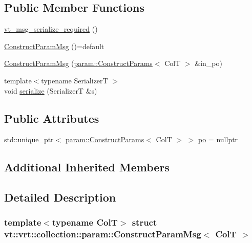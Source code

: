 \subsection*{Public Member Functions}
\begin{DoxyCompactItemize}
\item 
\hyperlink{structvt_1_1vrt_1_1collection_1_1param_1_1_construct_param_msg_a9be1c6d113987cf9f9663ca96714c29f}{vt\+\_\+msg\+\_\+serialize\+\_\+required} ()
\item 
\hyperlink{structvt_1_1vrt_1_1collection_1_1param_1_1_construct_param_msg_a1415970af3227cd834a309f96ad89c38}{Construct\+Param\+Msg} ()=default
\item 
\hyperlink{structvt_1_1vrt_1_1collection_1_1param_1_1_construct_param_msg_a3ed6dbf0fe1829c038c37bafbf9709c7}{Construct\+Param\+Msg} (\hyperlink{structvt_1_1vrt_1_1collection_1_1param_1_1_construct_params}{param\+::\+Construct\+Params}$<$ ColT $>$ \&in\+\_\+po)
\item 
{\footnotesize template$<$typename SerializerT $>$ }\\void \hyperlink{structvt_1_1vrt_1_1collection_1_1param_1_1_construct_param_msg_ae8be6d0a948ed0baa5debedb036b47fe}{serialize} (SerializerT \&s)
\end{DoxyCompactItemize}
\subsection*{Public Attributes}
\begin{DoxyCompactItemize}
\item 
std\+::unique\+\_\+ptr$<$ \hyperlink{structvt_1_1vrt_1_1collection_1_1param_1_1_construct_params}{param\+::\+Construct\+Params}$<$ ColT $>$ $>$ \hyperlink{structvt_1_1vrt_1_1collection_1_1param_1_1_construct_param_msg_a92fade35515ef7d83149ed86eae5de48}{po} = nullptr
\end{DoxyCompactItemize}
\subsection*{Additional Inherited Members}


\subsection{Detailed Description}
\subsubsection*{template$<$typename ColT$>$\newline
struct vt\+::vrt\+::collection\+::param\+::\+Construct\+Param\+Msg$<$ Col\+T $>$}

